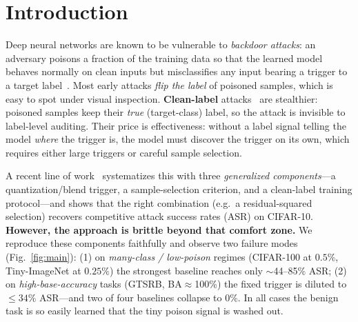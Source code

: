 \section{Introduction}
\label{sec:intro}

Deep neural networks are known to be vulnerable to \emph{backdoor attacks}: an
adversary poisons a fraction of the training data so that the learned model
behaves normally on clean inputs but misclassifies any input bearing a trigger
to a target label~\cite{gu2017badnets}. Most early attacks
\emph{flip the label} of poisoned samples, which is easy to spot under visual
inspection. \textbf{Clean-label} attacks~\cite{turner2018labelconsist,chen2019blended}
are stealthier: poisoned samples keep their \emph{true} (target-class) label, so
the attack is invisible to label-level auditing. Their price is effectiveness:
without a label signal telling the model \emph{where} the trigger is, the model
must discover the trigger on its own, which requires either large triggers or
careful sample selection.

A recent line of work~\cite{generalcomponents2025} systematizes this with three
\emph{generalized components}---a quantization/blend trigger, a sample-selection
criterion, and a clean-label training protocol---and shows that the right
combination (e.g.\ a residual-squared selection) recovers competitive attack
success rates (ASR) on CIFAR-10. \textbf{However, the approach is brittle beyond
that comfort zone.} We reproduce these components faithfully and observe two
failure modes (Fig.~\ref{fig:main}): (1) on \emph{many-class / low-poison}
regimes (CIFAR-100 at $0.5\%$, Tiny-ImageNet at $0.25\%$) the strongest baseline
reaches only $\sim$44--85\% ASR; (2) on \emph{high-base-accuracy} tasks
(GTSRB, BA$\approx$100\%) the fixed trigger is diluted to $\le 34\%$ ASR---and
two of four baselines collapse to $0\%$. In all cases the benign task is so
easily learned that the tiny poison signal is washed out.

